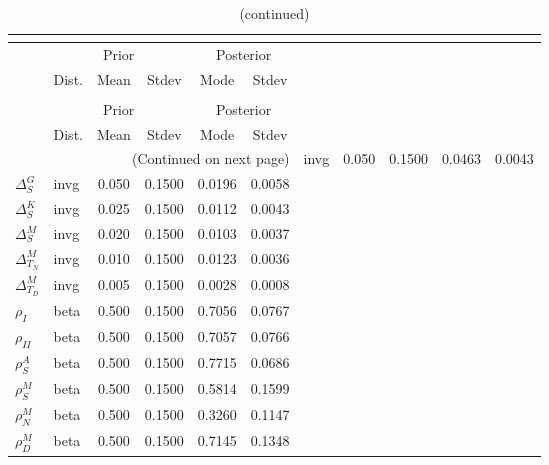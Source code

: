  
\begin{center}
\begin{longtable}{llcccc} 
\caption{Results from posterior maximization (parameters)}\\
 \label{Table:Posterior:1}\\
\toprule 
  & \multicolumn{3}{c}{Prior}  &  \multicolumn{2}{c}{Posterior} \\
  \cmidrule(r{.75em}){2-4} \cmidrule(r{.75em}){5-6}
  & Dist. & Mean  & Stdev & Mode & Stdev \\ 
\midrule \endfirsthead 
\caption{(continued)}\\
 \bottomrule 
  & \multicolumn{3}{c}{Prior}  &  \multicolumn{2}{c}{Posterior} \\
  \cmidrule(r{.75em}){2-4} \cmidrule(r{.75em}){5-6}
  & Dist. & Mean  & Stdev & Mode & Stdev \\ 
\midrule \endhead 
\bottomrule \multicolumn{6}{r}{(Continued on next page)}\endfoot 
\bottomrule\endlastfoot 
${\Delta^{A}_{S}}$ & invg &   0.050 & 0.1500 &   0.0463 &  0.0043 \\ 
${\Delta^{G}_{S}}$ & invg &   0.050 & 0.1500 &   0.0196 &  0.0058 \\ 
${\Delta^{K}_{S}}$ & invg &   0.025 & 0.1500 &   0.0112 &  0.0043 \\ 
${\Delta^{M}_{S}}$ & invg &   0.020 & 0.1500 &   0.0103 &  0.0037 \\ 
${\Delta^{M}_{T_N}}$ & invg &   0.010 & 0.1500 &   0.0123 &  0.0036 \\ 
${\Delta^{M}_{T_D}}$ & invg &   0.005 & 0.1500 &   0.0028 &  0.0008 \\ 
${\rho_{I}}$ & beta &   0.500 & 0.1500 &   0.7056 &  0.0767 \\ 
${\rho_{II}}$ & beta &   0.500 & 0.1500 &   0.7057 &  0.0766 \\ 
${\rho^{A}_{S}}$ & beta &   0.500 & 0.1500 &   0.7715 &  0.0686 \\ 
${\rho^{M}_{S}}$ & beta &   0.500 & 0.1500 &   0.5814 &  0.1599 \\ 
${\rho^{M}_{N}}$ & beta &   0.500 & 0.1500 &   0.3260 &  0.1147 \\ 
${\rho^{M}_{D}}$ & beta &   0.500 & 0.1500 &   0.7145 &  0.1348 \\ 
\end{longtable}
 \end{center}

